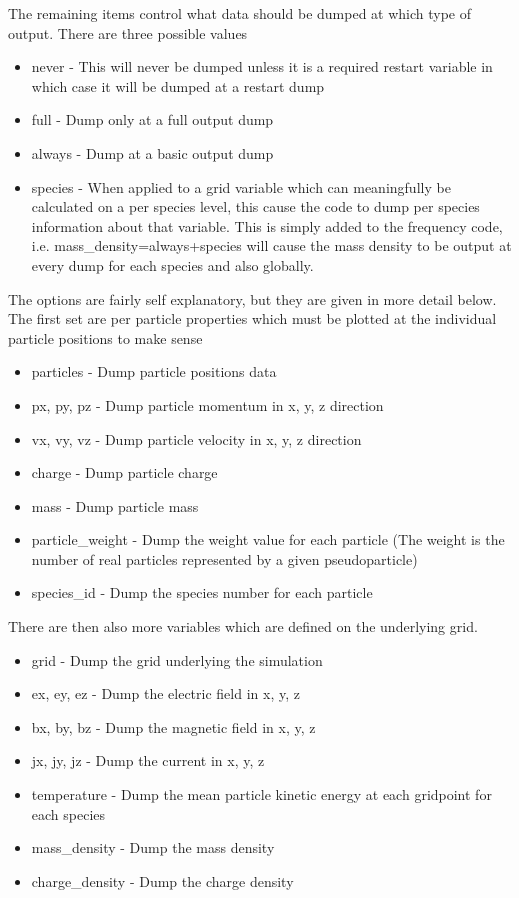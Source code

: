 \documentclass[12pt,a4paper]{article}
\begin{document}
The remaining items control what data should be dumped at which type of
output. There are three possible values\\
\begin{itemize}
\item never - This will never be dumped unless it is a required restart
  variable in which case it will be dumped at a restart dump
\item full - Dump only at a full output dump
\item always - Dump at a basic output dump
\item species - When applied to a grid variable which can meaningfully be
  calculated on a per species level, this cause the code to dump per species
  information about that variable. This is simply added to the frequency code,
  i.e. mass\_density=always+species will cause the mass density to be output
  at every dump for each species and also globally.
\end{itemize}

The options are fairly self explanatory, but they are given in more detail
below. The first set are per particle properties which must be plotted at the
individual particle positions to make sense\\
\begin{itemize}
\item particles - Dump particle positions data
\item px, py, pz - Dump particle momentum in x, y, z direction
\item vx, vy, vz - Dump particle velocity in x, y, z direction
\item charge - Dump particle charge
\item mass - Dump particle mass
\item particle\_weight - Dump the weight value for each particle (The weight
  is the number of real particles represented by a given pseudoparticle)
\item species\_id - Dump the species number for each particle
\end{itemize}

There are then also more variables which are defined on the underlying grid.\\
\begin{itemize}
\item grid - Dump the grid underlying the simulation
\item ex, ey, ez - Dump the electric field in x, y, z
\item bx, by, bz - Dump the magnetic field in x, y, z
\item jx, jy, jz - Dump the current in x, y, z
\item temperature - Dump the mean particle kinetic energy at each gridpoint
  for each species
\item mass\_density - Dump the mass density
\item charge\_density - Dump the charge density
\end{itemize}
\end{document}
